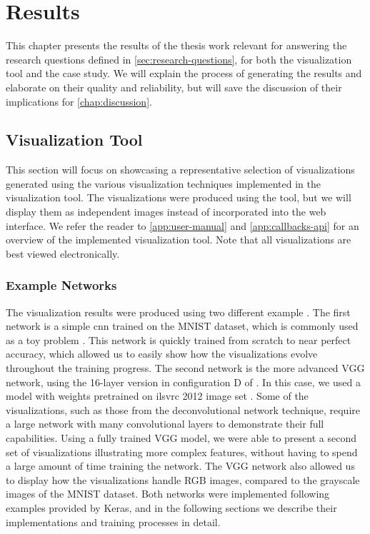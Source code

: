 
\chapter{Results} \label{chap:results}

This chapter presents the results of the thesis work relevant for answering the research questions defined in \autoref{sec:research-questions}, for both the visualization tool and the case study. We will explain the process of generating the results and elaborate on their quality and reliability, but will save the discussion of their implications for \autoref{chap:discussion}.

\section{Visualization Tool} \label{sec:visualization-tool-results}

This section will focus on showcasing a representative selection of visualizations generated using the various visualization techniques implemented in the visualization tool. The visualizations were produced using the tool, but we will display them as independent images instead of incorporated into the web interface. We refer the reader to \autoref{app:user-manual} and \autoref{app:callbacks-api} for an overview of the implemented visualization tool. Note that all visualizations are best viewed electronically.


\subsection{Example Networks} \label{sec:example-networks}

The visualization results were produced using two different example . The first network is a simple \acrshort{cnn} trained on the MNIST dataset, which is commonly used as a toy problem \cite{mnist}. This network is quickly trained from scratch to near perfect accuracy, which allowed us to easily show how the visualizations evolve throughout the training progress. The second network is the more advanced VGG network, using the 16-layer version in configuration D of \cite{vgg}. In this case, we used a model with weights pretrained on \acrshort{ilsvrc} 2012 image set \cite{imagenet}. Some of the visualizations, such as those from the deconvolutional network technique, require a large network with many convolutional layers to demonstrate their full capabilities. Using a fully trained VGG model, we were able to present a second set of visualizations illustrating more complex features, without having to spend a large amount of time training the network. The VGG network also allowed us to display how the visualizations handle RGB images, compared to the grayscale images of the MNIST dataset. Both networks were implemented following examples provided by Keras, and in the following sections we describe their implementations and training processes in detail.\\

